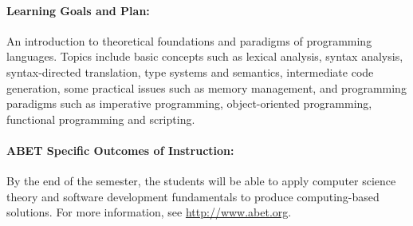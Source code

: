 \documentclass[11pt, epsfig]{article}
\begin{document}
\paragraph{Learning Goals and Plan:}  
An introduction to theoretical foundations and paradigms of programming
languages. Topics include basic concepts such as lexical analysis, syntax
analysis, syntax-directed translation, type systems and semantics, intermediate code generation, some
practical issues such as  memory management, and  programming paradigms such as
imperative programming, object-oriented programming, functional programming and
scripting.  

\paragraph{ABET Specific Outcomes of Instruction:}
By the end of the semester, the students will be able to
apply computer science theory and software development fundamentals to produce computing-based solutions. 
For more information, see \url{http://www.abet.org}.


\end{document}
